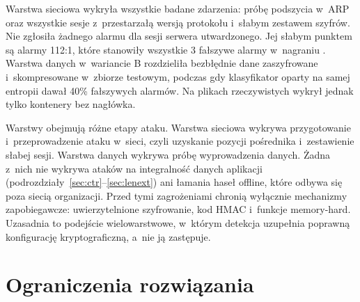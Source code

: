Warstwa sieciowa wykryła wszystkie badane zdarzenia: próbę podszycia w~ARP oraz wszystkie sesje z~przestarzałą wersją protokołu i~słabym zestawem szyfrów. Nie zgłosiła żadnego alarmu dla sesji serwera utwardzonego. Jej słabym punktem są alarmy 112:1, które stanowiły wszystkie 3 fałszywe alarmy w~nagraniu . Warstwa danych w~wariancie B rozdzieliła bezbłędnie dane zaszyfrowane i~skompresowane w~zbiorze testowym, podczas gdy klasyfikator oparty na samej entropii dawał 40\% fałszywych alarmów. Na plikach rzeczywistych wykrył jednak tylko kontenery bez nagłówka.

Warstwy obejmują różne etapy ataku. Warstwa sieciowa wykrywa przygotowanie i~przeprowadzenie ataku w~sieci, czyli uzyskanie pozycji pośrednika i~zestawienie słabej sesji. Warstwa danych wykrywa próbę wyprowadzenia danych. Żadna z~nich nie wykrywa ataków na integralność danych aplikacji (podrozdziały~\ref{sec:ctr}--\ref{sec:lenext}) ani łamania haseł offline, które odbywa się poza siecią organizacji. Przed tymi zagrożeniami chronią wyłącznie mechanizmy zapobiegawcze: uwierzytelnione szyfrowanie, kod HMAC i~funkcje memory-hard. Uzasadnia to podejście wielowarstwowe, w~którym detekcja uzupełnia poprawną konfigurację kryptograficzną, a~nie ją zastępuje.

\section{Ograniczenia rozwiązania}\label{sec:ograniczenia}

